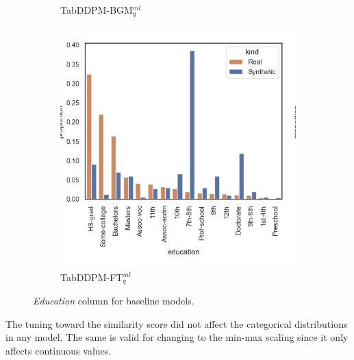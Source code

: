 \begin{figure}[h]
\begin{subfigure}{0.23\textwidth}
		\caption{TabDDPM-BGM$^{ml}_q$}
	\end{subfigure}
	\begin{subfigure}{0.23\textwidth}
		\centering
		\includegraphics[width=\textwidth]{images/dist_education/tab-ddpm-ft.jpg}
		\caption{TabDDPM-FT$^{ml}_q$}
	\end{subfigure}
	\caption[Distribution Plots Categorical]{\textit{Education} column for baseline models.}
	\label{fig:education}
\end{figure}

The tuning toward the similarity score did not affect the categorical distributions in any model.
The same is valid for changing to the min-max scaling since it only affects continuous values.


